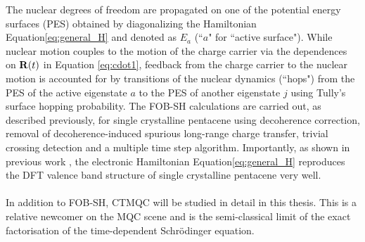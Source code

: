 The nuclear degrees of freedom are propagated on one of the potential energy surfaces (PES) obtained by diagonalizing the
Hamiltonian Equation\eqref{eq:general_H} and denoted as $E_a$ (``$a$" for ``active surface"). While nuclear motion
couples to the motion of the charge carrier via the dependences on ${\bf R}(t)$ in Equation \eqref{eq:cdot1}, feedback
from the charge carrier to the nuclear motion is accounted for by transitions of the nuclear dynamics (``hops") from
the PES of the active eigenstate $a$ to the PES of another eigenstate $j$ using Tully's surface hopping probability.\cite{FSSH_orig}
The FOB-SH calculations are carried out, as described previously, for single crystalline pentacene\cite{Giannini2020} using  decoherence correction, removal of decoherence-induced spurious long-range charge transfer, trivial crossing detection
and a multiple time step algorithm. Importantly, as shown in previous work \cite{gajdos_ultrafast_2014}, the electronic Hamiltonian Equation\eqref{eq:general_H}
reproduces the DFT valence band structure of single crystalline pentacene\cite{Giannini2020} very well.
\\\\
In addition to FOB-SH, CTMQC will be studied in detail in this thesis. This is a relative newcomer on the MQC scene and is the semi-classical limit of the exact factorisation of the time-dependent Schr\"odinger equation.
